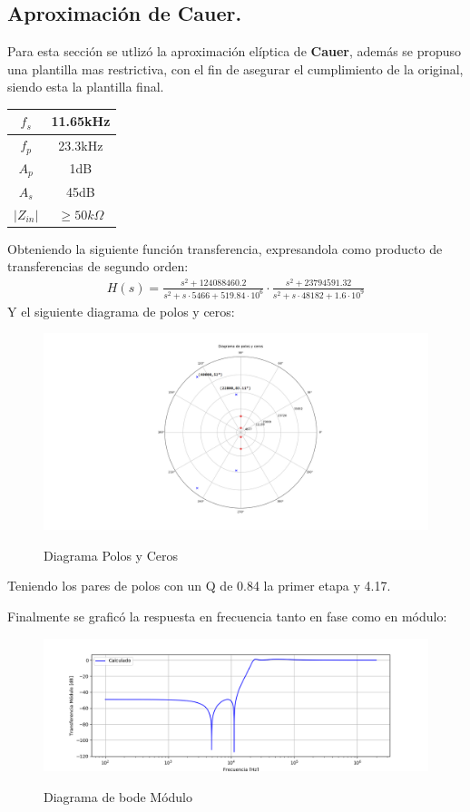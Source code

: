 \subsection{Aproximación de Cauer.}
Para esta sección se utlizó la aproximación elíptica de \textbf{Cauer}, además se propuso una plantilla mas restrictiva, con el fin de asegurar el cumplimiento de la original, siendo esta la plantilla final.
\begin{table}[H]
\centering
\begin{tabular}{|c|c|}
\hline
$f_s$      & 11.65kHz          \\ \hline
$f_p$      & 23.3kHz           \\ \hline
$A_p$      & 1dB               \\ \hline
$A_s$      & 45dB              \\ \hline
$|Z_{in}|$ & $\geq 50k \Omega$ \\ \hline
\end{tabular}
\end{table}
Obteniendo la siguiente función transferencia, expresandola como producto de transferencias de segundo orden:
\begin{align}
	H(s)=\frac{ {s}^{2}+ 124088460.2 
 }{s^2+s\cdot 5466 + 519.84\cdot 10^6 } \cdot \frac{  {s}^{2}+
 23794591.32 }{s^2+s\cdot 48182 + 1.6\cdot 10^9 }
\label{eq:trans}
\end{align}
Y el siguiente diagrama de polos y ceros:
\begin{figure}[H]
	\centering
	\includegraphics[width=\textwidth]{Imagenes-Ej3/DiagramaPolosYCeros.png}
	\label{fig:poleZeroDiag}
	\caption{Diagrama Polos y Ceros}
\end{figure}

Teniendo los pares de polos con un Q de 0.84 la primer etapa y 4.17.


Finalmente se graficó la respuesta en frecuencia tanto en fase como en módulo:
\begin{figure}[H]
	\centering
	\includegraphics[width=\textwidth]{Imagenes-Ej3/BodeCalc.png}
	\label{fig:Bodecalc}
	\caption{Diagrama de bode Módulo}
\end{figure}

